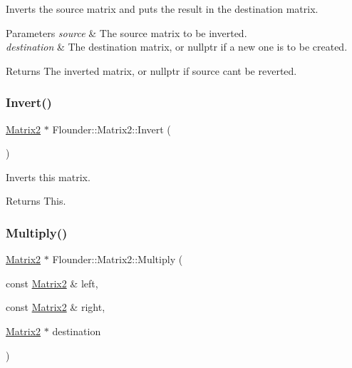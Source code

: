 Inverts the source matrix and puts the result in the destination matrix. 


\begin{DoxyParams}{Parameters}
{\em source} & The source matrix to be inverted. \\
\hline
{\em destination} & The destination matrix, or nullptr if a new one is to be created. \\
\hline
\end{DoxyParams}
\begin{DoxyReturn}{Returns}
The inverted matrix, or nullptr if source can\textquotesingle{}t be reverted. 
\end{DoxyReturn}
\mbox{\label{class_flounder_1_1_matrix2_a246d883584ea3193e2db6018a39046cc}} 
\subsubsection{\texorpdfstring{Invert()}{Invert()}\hspace{0.1cm}{\footnotesize\ttfamily [2/2]}}
{\footnotesize\ttfamily \hyperlink{class_flounder_1_1_matrix2}{Matrix2} $\ast$ Flounder\+::\+Matrix2\+::\+Invert (\begin{DoxyParamCaption}{ }\end{DoxyParamCaption})}



Inverts this matrix. 

\begin{DoxyReturn}{Returns}
This. 
\end{DoxyReturn}
\mbox{\label{class_flounder_1_1_matrix2_a6084cf89e1f8f64041ca5a852e9888ce}} 
\subsubsection{\texorpdfstring{Multiply()}{Multiply()}}
{\footnotesize\ttfamily \hyperlink{class_flounder_1_1_matrix2}{Matrix2} $\ast$ Flounder\+::\+Matrix2\+::\+Multiply (\begin{DoxyParamCaption}\item[{const \hyperlink{class_flounder_1_1_matrix2}{Matrix2} \&}]{left,  }\item[{const \hyperlink{class_flounder_1_1_matrix2}{Matrix2} \&}]{right,  }\item[{\hyperlink{class_flounder_1_1_matrix2}{Matrix2} $\ast$}]{destination }\end{DoxyParamCaption})\hspace{0.3cm}{\ttfamily [static]}}



